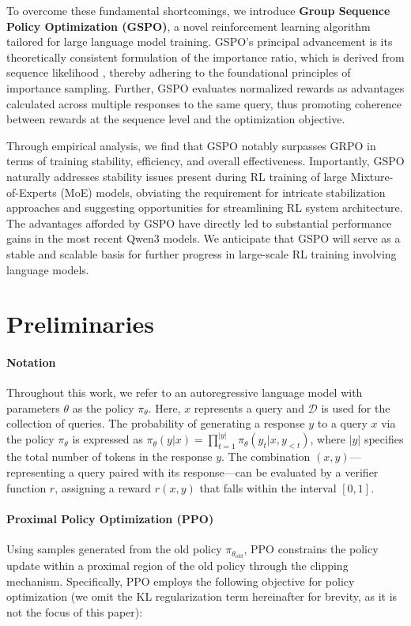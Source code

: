 To overcome these fundamental shortcomings, we introduce \textbf{Group Sequence Policy Optimization (GSPO)}, a novel reinforcement learning algorithm tailored for large language model training. GSPO’s principal advancement is its theoretically consistent formulation of the importance ratio, which is derived from sequence likelihood \citep{click}, thereby adhering to the foundational principles of importance sampling. Further, GSPO evaluates normalized rewards as advantages calculated across multiple responses to the same query, thus promoting coherence between rewards at the sequence level and the optimization objective.

Through empirical analysis, we find that GSPO notably surpasses GRPO in terms of training stability, efficiency, and overall effectiveness. Importantly, GSPO naturally addresses stability issues present during RL training of large Mixture-of-Experts (MoE) models, obviating the requirement for intricate stabilization approaches and suggesting opportunities for streamlining RL system architecture. The advantages afforded by GSPO have directly led to substantial performance gains in the most recent Qwen3 models. We anticipate that GSPO will serve as a stable and scalable basis for further progress in large-scale RL training involving language models.

\section{Preliminaries}

\paragraph{Notation}
Throughout this work, we refer to an autoregressive language model with parameters $\theta$ as the policy $\pi_\theta$. Here, $x$ represents a query and $\mathcal{D}$ is used for the collection of queries. The probability of generating a response $y$ to a query $x$ via the policy $\pi_\theta$ is expressed as $\pi_\theta(y | x) = \prod_{t=1}^{|y|} \pi_\theta(y_t | x, y_{<t})$, where $|y|$ specifies the total number of tokens in the response $y$. The combination $(x, y)$—representing a query paired with its response—can be evaluated by a verifier function $r$, assigning a reward $r(x, y)$ that falls within the interval $[0, 1]$.

\paragraph{Proximal Policy Optimization (PPO)} Using samples generated from the old policy $\pi_{\theta_\text{old}}$, PPO \citep{ppo} constrains the policy update within a proximal region of the old policy through the clipping mechanism. Specifically, PPO employs the following objective for policy optimization (we omit the KL regularization term hereinafter for brevity, as it is not the focus of this paper):

